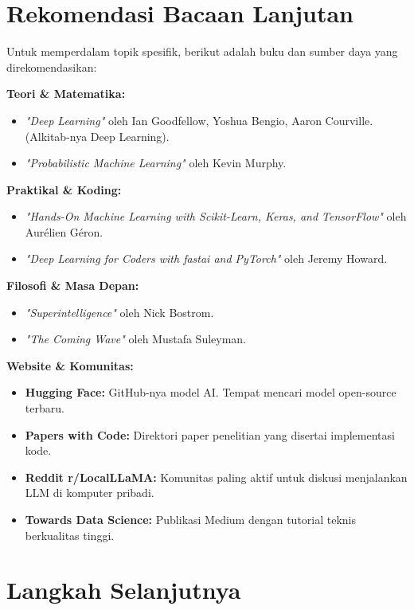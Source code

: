 \newpage
\section*{Rekomendasi Bacaan Lanjutan}

Untuk memperdalam topik spesifik, berikut adalah buku dan sumber daya yang direkomendasikan:

\textbf{Teori \& Matematika:}
\begin{itemize}
    \item \textit{"Deep Learning"} oleh Ian Goodfellow, Yoshua Bengio, Aaron Courville. (Alkitab-nya Deep Learning).
    \item \textit{"Probabilistic Machine Learning"} oleh Kevin Murphy.
\end{itemize}

\textbf{Praktikal \& Koding:}
\begin{itemize}
    \item \textit{"Hands-On Machine Learning with Scikit-Learn, Keras, and TensorFlow"} oleh Aurélien Géron.
    \item \textit{"Deep Learning for Coders with fastai and PyTorch"} oleh Jeremy Howard.
\end{itemize}

\textbf{Filosofi \& Masa Depan:}
\begin{itemize}
    \item \textit{"Superintelligence"} oleh Nick Bostrom.
    \item \textit{"The Coming Wave"} oleh Mustafa Suleyman.
\end{itemize}

\textbf{Website \& Komunitas:}
\begin{itemize}
    \item \textbf{Hugging Face:} GitHub-nya model AI. Tempat mencari model open-source terbaru.
    \item \textbf{Papers with Code:} Direktori paper penelitian yang disertai implementasi kode.
    \item \textbf{Reddit r/LocalLLaMA:} Komunitas paling aktif untuk diskusi menjalankan LLM di komputer pribadi.
    \item \textbf{Towards Data Science:} Publikasi Medium dengan tutorial teknis berkualitas tinggi.
\end{itemize}

\section*{Langkah Selanjutnya}

